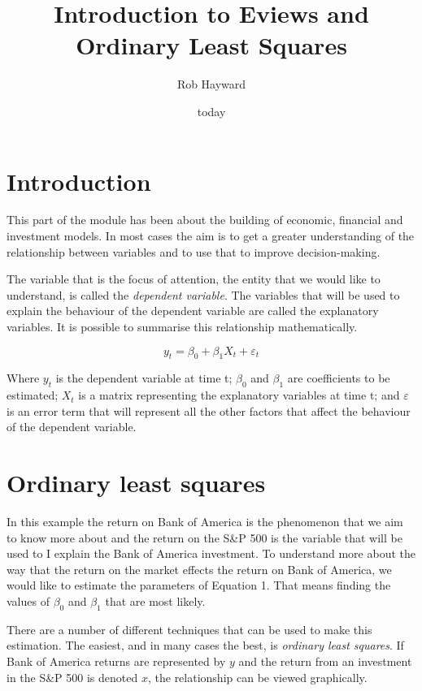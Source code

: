 \documentclass{article}\usepackage[]{graphicx}\usepackage[]{color}
\title{Introduction to Eviews and Ordinary Least Squares}
\author{Rob Hayward}
\date{today}
\begin{document}
\doublespace
\maketitle
\section*{Introduction}

This part of the module has been about the building of economic, financial and investment models.  In most cases the aim is to get a greater understanding of the relationship between variables and to use that to improve decision-making. 

The variable that is the focus of attention, the entity that we would like to understand, is called the \emph{dependent variable}.  The variables that will be used to explain the behaviour of the dependent variable are called the explanatory variables.   It is possible to summarise this relationship mathematically.

\begin{equation}\label{reg}
y_t = \beta_0 + \beta_1 X_t + \varepsilon_t
\end{equation}

Where $y_t$ is the dependent variable at time t; $\beta_0$ and $\beta_1$ are coefficients to be estimated; $X_t$ is a matrix representing the explanatory variables at time t; and $\varepsilon$ is an error term that will represent all the other factors that affect the behaviour of the dependent variable.

\section*{Ordinary least squares}
In this example the return on Bank of America is the phenomenon that we aim to know more about and the return on the S\&P 500 is the variable that will be used to I explain the Bank of America investment. To understand more about the way that the return on the market effects the return on Bank of America,  we would like to estimate the parameters of Equation 1.  That means finding the values of $\beta_0$ and $\beta_1$ that are most likely.   

There are a number of different techniques that can be used to make this estimation.  The easiest, and  in many cases the best, is \emph{ordinary least squares}.  If Bank of America returns are represented by $y$ and the return from an investment in the S\&P 500 is denoted $x$, the relationship can be viewed graphically.  
\end{document}
